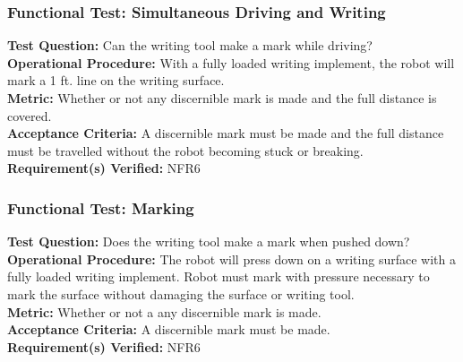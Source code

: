 \subsubsection{Functional Test: Simultaneous Driving and Writing}
\label{test:writing_ft_both}
\textbf{Test Question:} Can the writing tool make a mark while driving? \\
\textbf{Operational Procedure:} With a fully loaded writing implement, the robot will mark a 1 ft. line on the writing surface.\\
\textbf{Metric:} Whether or not any discernible mark is made and the full distance is covered. \\
\textbf{Acceptance Criteria:} A discernible mark must be made and the full distance must be travelled without the robot becoming stuck or breaking.\\
\textbf{Requirement(s) Verified:} NFR6 \\

\subsubsection{Functional Test: Marking}
\label{test:writing_ft_mark}
\textbf{Test Question:} Does the writing tool make a mark when pushed down? \\
\textbf{Operational Procedure:} The robot will press down on a writing surface with a fully loaded writing implement. Robot must mark with pressure necessary to mark the surface without damaging the surface or writing tool.\\
\textbf{Metric:} Whether or not a any discernible mark is made. \\
\textbf{Acceptance Criteria:} A discernible mark must be made.\\
\textbf{Requirement(s) Verified:} NFR6 \\
